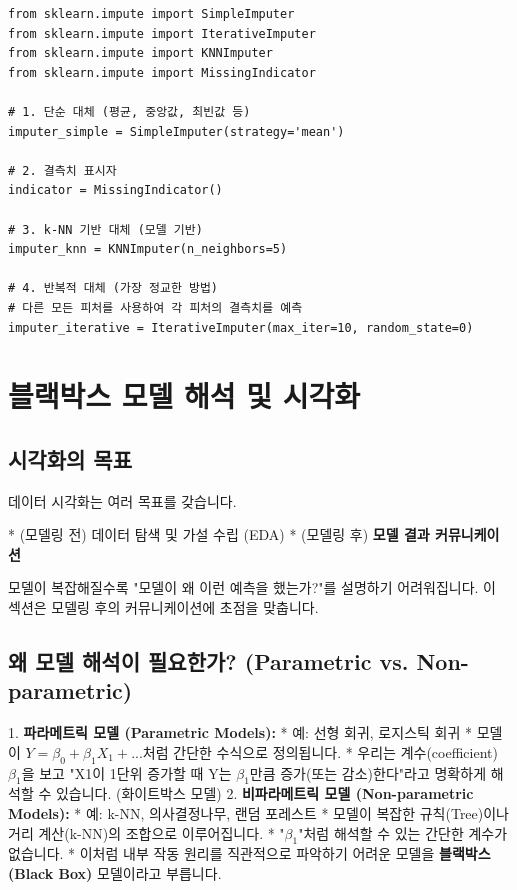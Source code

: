 \documentclass[11pt,a4paper]{book}
\theoremstyle{definition}
\begin{document}
\begin{lstlisting}[caption={sklearn의 주요 Imputer}, label={lst:imputers}, breaklines=true]
from sklearn.impute import SimpleImputer
from sklearn.impute import IterativeImputer
from sklearn.impute import KNNImputer
from sklearn.impute import MissingIndicator

# 1. 단순 대체 (평균, 중앙값, 최빈값 등)
imputer_simple = SimpleImputer(strategy='mean')

# 2. 결측치 표시자
indicator = MissingIndicator()

# 3. k-NN 기반 대체 (모델 기반)
imputer_knn = KNNImputer(n_neighbors=5)

# 4. 반복적 대체 (가장 정교한 방법)
# 다른 모든 피처를 사용하여 각 피처의 결측치를 예측
imputer_iterative = IterativeImputer(max_iter=10, random_state=0)
\end{lstlisting}


\section{블랙박스 모델 해석 및 시각화}

\subsection{시각화의 목표}

데이터 시각화는 여러 목표를 갖습니다.

* (모델링 전) 데이터 탐색 및 가설 수립 (EDA)
* (모델링 후) \textbf{모델 결과 커뮤니케이션}

모델이 복잡해질수록 "모델이 왜 이런 예측을 했는가?"를 설명하기 어려워집니다. 이 섹션은 모델링 후의 커뮤니케이션에 초점을 맞춥니다.

\subsection{왜 모델 해석이 필요한가? (Parametric vs. Non-parametric)}

1.  \textbf{파라메트릭 모델 (Parametric Models):}
    * 예: 선형 회귀, 로지스틱 회귀
    * 모델이 \(Y = \beta_0 + \beta_1 X_1 + ...\)처럼 간단한 수식으로 정의됩니다.
    * 우리는 계수(coefficient) \(\beta_1\)을 보고 "X1이 1단위 증가할 때 Y는 \(\beta_1\)만큼 증가(또는 감소)한다"라고 명확하게 해석할 수 있습니다. (화이트박스 모델)
2.  \textbf{비파라메트릭 모델 (Non-parametric Models):}
    * 예: k-NN, 의사결정나무, 랜덤 포레스트
    * 모델이 복잡한 규칙(Tree)이나 거리 계산(k-NN)의 조합으로 이루어집니다.
    * "\(\beta_1\)"처럼 해석할 수 있는 간단한 계수가 없습니다.
    * 이처럼 내부 작동 원리를 직관적으로 파악하기 어려운 모델을 \textbf{블랙박스(Black Box)} 모델이라고 부릅니다.
\end{document}
